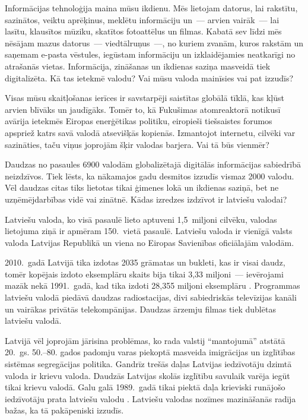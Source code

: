 \begin{multicols}{2}

Informācijas tehnoloģija maina mūsu ikdienu.
Mēs lietojam datorus, lai rakstītu, sazinātos, veiktu aprēķinus, meklētu informāciju un~--- arvien vairāk~--- lai lasītu, klausītos mūziku, skatītos fotoattēlus un filmas.
Kabatā sev līdzi mēs nēsājam mazus datorus~--- viedtālruņus~---, no kuriem zvanām, kuros rakstām un saņemam e-pasta vēstules, iegūstam informāciju un izklaidējamies neatkarīgi no atrašanās vietas.
Informācija, zināšanas un ikdienas saziņa masveidā tiek digitalizēta.
Kā tas ietekmē valodu?
Vai mūsu valoda mainīsies vai pat izzudīs? 

Visas mūsu skaitļošanas ierīces ir savstarpēji saistītas globālā tīklā, kas kļūst arvien blīvāks un jaudīgāks.
Tomēr to, kā Fukušimas atomreaktorā notikusī avārija ietekmēs Eiropas enerģētikas politiku, eiropieši tiešsaistes forumos apspriež katrs savā valodā atsevišķās kopienās.
Izmantojot internetu, cilvēki var sazināties, taču viņus joprojām šķir valodas barjera.
Vai tā būs vienmēr? 

Daudzas no pasaules 6900 valodām globalizētajā digitālās informācijas sabiedrībā neizdzīvos.
Tiek lēsts, ka nākamajos gadu desmitos izzudīs vismaz 2000 valodu.
Vēl daudzas citas tiks lietotas tikai ģimenes lokā un ikdienas saziņā, bet ne uzņēmējdarbības vidē vai zinātnē.
Kādas izredzes izdzīvot ir latviešu valodai?

Latviešu valoda, ko visā pasaulē lieto aptuveni 1,5~miljoni cilvēku, valodas lietojuma ziņā ir apmēram 150.~vietā pasaulē.
Latviešu valoda ir vienīgā valsts valoda Latvijas Republikā un viena no Eiropas Savienības oficiālajām valodām. 

2010.~gadā Latvijā tika izdotas 2035 grāmatas un bukleti, kas ir visai daudz, tomēr kopējais izdoto eksemplāru skaits bija tikai 3,33 miljoni~--- ievērojami mazāk \mbox{nekā} 1991.~gadā, kad tika izdoti 28,355 miljoni eksemplāru \cite{Meta1ES}.
Programmas latviešu valodā piedāvā daudzas radiostacijas, divi sabiedriskās televīzijas kanāli un vairākas privātās telekompānijas.
Daudzas ārzemju filmas tiek dublētas latviešu valodā. 

Latvijā vēl joprojām jārisina problēmas, ko rada valstij ``mantojumā'' atstātā 20.~gs. 50.–80. gados padomju varas piekoptā masveida imigrācijas un izglītības sistēmas segregācijas politika.
Gandrīz trešās daļas Latvijas iedzīvotāju dzimtā valoda ir krievu valoda.
Daudzās Latvijas skolās izglītību savulaik varēja iegūt tikai krievu valodā.
Galu galā 1989.~gadā tikai piektā daļa krieviski runājošo iedzīvotāju prata latviešu valodu \cite{Meta2ES}.
Latviešu valodas nozīmes mazināšanās radīja bažas, ka tā pakāpeniski izzudīs.


\end{multicols}
